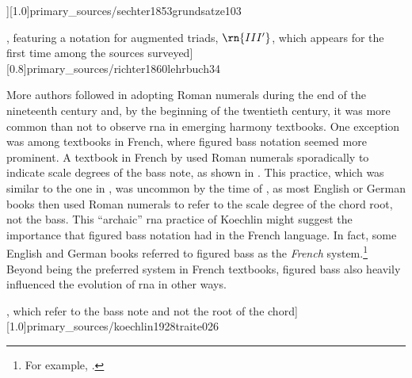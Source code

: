 \phdfigure[Use of Roman numerals, underneath chord label
 annotations, in \textcite[p.
 103]{sechter1853grundsatze}][1.0]{primary_sources/sechter1853grundsatze103}

\phdfigure[Adoption of the Weber syntax in \textcite[p.
34]{richter1860lehrbuch}, featuring a notation for augmented
triads, $\rn{III'}$, which appears for the first time among
the sources
surveyed][0.8]{primary_sources/richter1860lehrbuch34}

More authors followed in adopting Roman numerals during the
end of the nineteenth century and, by the beginning of the
twentieth century, it was more common than not to observe
\gls{rna} in emerging harmony textbooks. One exception was
among textbooks in French, where figured bass notation
seemed more prominent. A textbook in French by
\textcite{koechlin1928traite} used Roman numerals
sporadically to indicate scale degrees of the bass note, as
shown in .
This practice, which was similar to the one in
\textcite{hamilton1840catechism}, was uncommon by the time
of \textcite{koechlin1928traite}, as most English or German
books then used Roman numerals to refer to the scale degree
of the chord root, not the bass. This ``archaic'' \gls{rna}
practice of Koechlin might suggest the importance that
figured bass notation had in the French language. In fact,
some English and German books referred to figured bass as
the \emph{French} system.\footnote{For example,
\textcite{norris1894practical}.} Beyond being the preferred
system in French textbooks, figured bass also heavily
influenced the evolution of \gls{rna} in other ways.

\phdfigure[The scale-degrees of \textcite[p.
26]{koechlin1928traite}, which refer to the bass note and
not the root of the
chord][1.0]{primary_sources/koechlin1928traite026}
